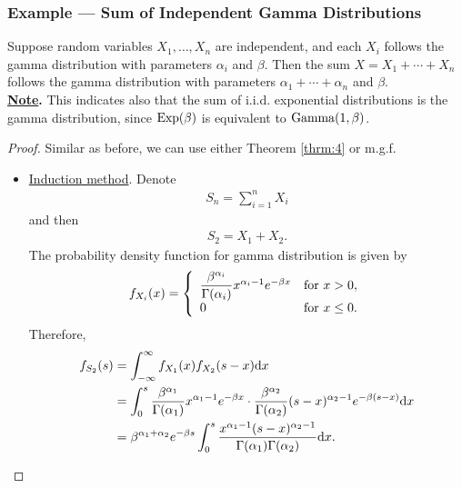 \subsubsection*{Example --- Sum of Independent Gamma Distributions}

Suppose random variables $X_1, \ldots, X_n$ are independent, and each $X_i$ follows the gamma distribution with parameters $\alpha_i$ and $\beta$. Then the sum $X = X_1 + \cdots + X_n$ follows the gamma distribution with parameters $\alpha_1 + \cdots + \alpha_n$ and $\beta$. \\
\textbf{\underline{Note}.} This indicates also that the sum of i.i.d. exponential distributions is the gamma distribution, since $\mathrm{Exp}(\beta)$ is equivalent to $\mathrm{Gamma}(1, \beta)$.
\begin{proof}
	Similar as before, we can use either Theorem \ref{thrm:4} or m.g.f.
	\begin{itemize}
		\item \underline{Induction method}. Denote
		\begin{align*}
		S_n = \sum_{i=1}^n X_i
		\end{align*}
		and then
		\begin{align*}
		S_2 = X_1 + X_2.
		\end{align*}
		The probability density function for gamma distribution is given by
		\begin{align*}
		f_{X_i}(x) = \left\{
		\begin{array}{ll}
		\dfrac{\beta^{\alpha_i}}{\Gamma(\alpha_i)} x^{\alpha_i-1}e^{-\beta x} & \mathrm{for\ } x > 0, \\
		0 & \mathrm{for\ } x\leq 0.
		\end{array}
		\right.
		\end{align*}
		Therefore,
		\begin{align*}
		f_{S_2}(s) & = \int_{-\infty}^{\infty} f_{X_1}(x)f_{X_2}(s-x)\mathrm{d}x \\
		& = \int_0^{s} \dfrac{\beta^{\alpha_1}}{\Gamma(\alpha_1)} x^{\alpha_1-1}e^{-\beta x} \cdot \dfrac{\beta^{\alpha_2}}{\Gamma(\alpha_2)} (s-x)^{\alpha_2-1}e^{-\beta (s-x)} \mathrm{d}x \\
		& = \beta^{\alpha_1 + \alpha_2}e^{-\beta s} \int_0^s \frac{x^{\alpha_1 - 1}(s-x)^{\alpha_2-1}}{\Gamma(\alpha_1)\Gamma(\alpha_2)}\mathrm{d}x.
		\end{align*}
\end{itemize}
\end{proof}
